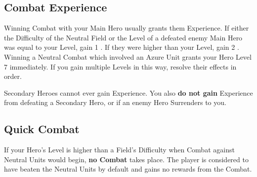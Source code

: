 \begin{multicols}{2}
\subsection*{\hypertarget{Combatexperience}{Combat Experience}}

Winning Combat with your Main Hero usually grants them Experience.
If either the Difficulty of the Neutral Field or the Level of a defeated enemy Main Hero was equal to your Level, gain 1 .
If they were higher than your Level, gain 2 .
Winning a Neutral Combat which involved an Azure  Unit grants your Hero Level 7 immediately.
If you gain multiple Levels in this way, resolve their effects in order.\par
Secondary Heroes cannot ever gain Experience.
You also \textbf{do not gain} Experience from defeating a Secondary Hero, or if an enemy Hero Surrenders to you.
\subsection*{\hypertarget{Quick}{Quick Combat}}
If your Hero's Level is higher than a Field's Difficulty when Combat against Neutral Units would begin, \textbf{no Combat} takes place.
The player is considered to have beaten the Neutral Units by default and gains no rewards from the Combat.


\end{multicols}
